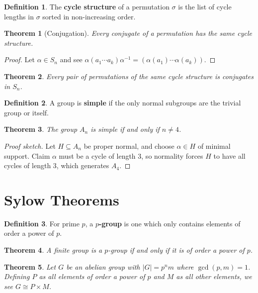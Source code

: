 \documentclass[
    parskip=half,
    toc=flat,
    toc=sectionentrydotfill,
]{scrartcl}  %
\theoremstyle{definition}
\newtheorem{definition}{Definition}[section]
\theoremstyle{plain}
\newtheorem{theorem}{Theorem}[section]
\theoremstyle{remark}
\begin{document}
\begin{definition}
    The \textbf{cycle structure} of a permutation $\sigma$ is the list of cycle lengths in $\sigma$ sorted in
    non-increasing order.
\end{definition}

\begin{theorem}[Conjugation]
    Every conjugate of a permutation has the same cycle structure.
\end{theorem}

\begin{proof}
    Let $\alpha\in S_n$ and see $\alpha(a_1\cdots a_k)\alpha^{-1}=(\alpha(a_1)\cdots\alpha(a_k))$.
\end{proof}

\begin{theorem}
    Every pair of permutations of the same cycle structure is conjugates in $S_n$.
\end{theorem}

\begin{definition}
    A group is \textbf{simple} if the only normal subgroups are the trivial group or itself.
\end{definition}

\begin{theorem}
    The group $A_n$ is simple if and only if $n\neq 4$.
\end{theorem}

\begin{proof}[Proof sketch]
    Let $H\subseteq A_n$ be proper normal, and choose $\alpha\in H$ of minimal support.
    Claim $\alpha$ must be a cycle of length 3, so normality forces $H$ to have all cycles of length 3, which generates
    $A_4$.
\end{proof}


\section{Sylow Theorems}


\begin{definition}
    For prime $p$, a \textbf{$p$-group} is one which only contains elements of order a power of $p$.
\end{definition}

\begin{theorem}
    A finite group is a $p$-group if and only if it is of order a power of $p$.
\end{theorem}

\begin{theorem}
    Let $G$ be an abelian group with $|G|=p^nm$ where $\gcd(p,m)=1$.
    Defining $P$ as all elements of order a power of $p$ and $M$ as all other elements, we see $G\cong P\times M$.
\end{theorem}
\end{document}
